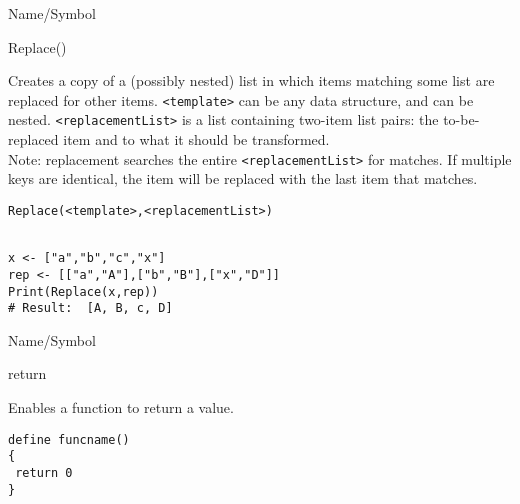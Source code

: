 \begin{desc}{Name/Symbol}
\item[Name/Symbol]  	Replace()

\item[Description]  	Creates a copy of a (possibly nested) list in which
		items matching some list are replaced for other items.  
		\verb+<template>+ can be any data structure, and can be nested.  
		\verb+<replacementList>+ is a list containing two-item list pairs:
		the to-be-replaced item and to what it should be transformed.\\
		Note: replacement searches the entire \verb+<replacementList>+ for 
		matches.  If multiple keys are identical, the item will be 
		replaced with the last item that matches.

\item[Usage]        	
\begin{verbatim}
Replace(<template>,<replacementList>)
\end{verbatim}
			  
\item[Example]     	
\begin{verbatim}

x <- ["a","b","c","x"]
rep <- [["a","A"],["b","B"],["x","D"]]
Print(Replace(x,rep))
# Result:  [A, B, c, D] 
\end{verbatim}

\item[See Also]	
\end{desc}

\rl


\begin{desc}{Name/Symbol}
\item[Name/Symbol] 	return

\item[Description]  	Enables a function to return a value.

\item[Usage]
\begin{verbatim}
define funcname()
{
 return 0
}
\end{verbatim}

\item[Example]	

\item[See Also]	
\end{desc}

\rl


